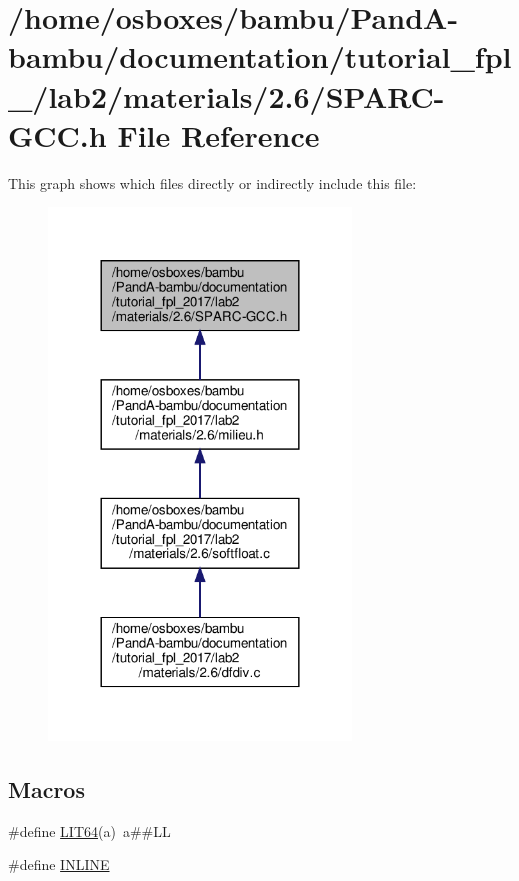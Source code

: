 \hypertarget{tutorial__fpl__2017_2lab2_2materials_22_86_2SPARC-GCC_8h}{}\section{/home/osboxes/bambu/\+Pand\+A-\/bambu/documentation/tutorial\+\_\+fpl\+\_/lab2/materials/2.6/\+S\+P\+A\+R\+C-\/\+G\+CC.h File Reference}
\label{tutorial__fpl__2017_2lab2_2materials_22_86_2SPARC-GCC_8h}
This graph shows which files directly or indirectly include this file\+:
\nopagebreak
\begin{figure}[H]
\begin{center}
\leavevmode
\includegraphics[width=228pt]{d6/d05/tutorial__fpl__2017_2lab2_2materials_22_86_2SPARC-GCC_8h__dep__incl}
\end{center}
\end{figure}
\subsection*{Macros}
\begin{DoxyCompactItemize}
\item 
\#define \hyperlink{tutorial__fpl__2017_2lab2_2materials_22_86_2SPARC-GCC_8h_a575f5a619c8e7d71c338c70a2b4e25a5}{L\+I\+T64}(a)~a\#\#LL
\item 
\#define \hyperlink{tutorial__fpl__2017_2lab2_2materials_22_86_2SPARC-GCC_8h_a2eb6f9e0395b47b8d5e3eeae4fe0c116}{I\+N\+L\+I\+NE}
\end{DoxyCompactItemize}
